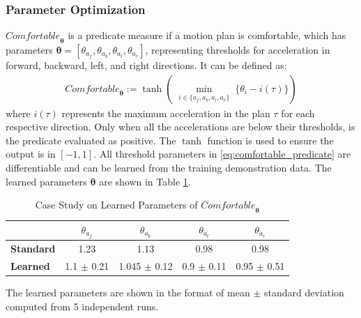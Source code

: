 \subsubsection{Parameter Optimization}

$\mathit{Comfortable}_{\boldsymbol{\theta}}$ is a predicate measure if a motion plan is comfortable, which has parameters $\boldsymbol{\theta} = [\theta_{a_{f}}, \theta_{a_{b}}, \theta_{a_{l}}, \theta_{a_{r}}]$, representing thresholds for acceleration in forward, backward, left, and right directions. It can be defined as:
\begin{align}
    \mathit{Comfortable}_{\boldsymbol{\theta}} := \tanh(\min_{\substack{i \in \{a_{f}, a_{b}, a_{l}, a_{r}\}}} \{\theta_i - i(\tau)\})
\end{align}
\label{eq:comfortable_predicate}
where $i(\tau)$ represents the maximum acceleration in the plan $\tau$ for each respective direction.
Only when all the accelerations are below their thresholds, is the predicate evaluated as positive. The $\tanh$ function is used to ensure the output is in $[-1, 1]$. All threshold parameters in \eqref{eq:comfortable_predicate} are differentiable and can be learned from the training demonstration data.
The learned parameters $\boldsymbol{\theta}$ are shown in Table \ref{tab: parameter-optimization}.

\begin{table}[!htp]\centering
    \caption{Case Study on Learned Parameters of $\mathit{Comfortable}_{\boldsymbol{\theta}}$}\label{tab: parameter-optimization}
    \scriptsize
    \begin{tabular}{l|cccc}\toprule
                          & $\theta_{a_{f}}$ & $\theta_{a_{b}}$ & $\theta_{a_{l}}$ & $\theta_{a_{r}}$ \\\midrule
        \textbf{Standard} & 1.23             & 1.13             & 0.98             & 0.98             \\
        \textbf{Learned}  & 1.1  $\pm$ 0.21  & 1.045 $\pm$ 0.12 & 0.9 $\pm$ 0.11   & 0.95 $\pm$ 0.51  \\
        \bottomrule
    \end{tabular}
    \begin{tablenotes}
        \item The learned parameters are shown in the format of mean $\pm$ standard deviation computed from 5 independent runs.
    \end{tablenotes}
\end{table}

